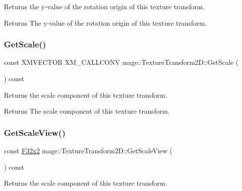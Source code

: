 Returns the y-\/value of the rotation origin of this texture transform.

\begin{DoxyReturn}{Returns}
The y-\/value of the rotation origin of this texture transform. 
\end{DoxyReturn}
\mbox{\label{classmage_1_1_texture_transform2_d_a012b9ef8da2821618b3eeb91e9888940}} 
\subsubsection{\texorpdfstring{Get\+Scale()}{GetScale()}}
{\footnotesize\ttfamily const X\+M\+V\+E\+C\+T\+OR X\+M\+\_\+\+C\+A\+L\+L\+C\+O\+NV mage\+::\+Texture\+Transform2\+D\+::\+Get\+Scale (\begin{DoxyParamCaption}{ }\end{DoxyParamCaption}) const\hspace{0.3cm}{\ttfamily [noexcept]}}

Returns the scale component of this texture transform.

\begin{DoxyReturn}{Returns}
The scale component of this texture transform. 
\end{DoxyReturn}
\mbox{\label{classmage_1_1_texture_transform2_d_a127faf8911063c5afc92daf39e97a332}} 
\subsubsection{\texorpdfstring{Get\+Scale\+View()}{GetScaleView()}}
{\footnotesize\ttfamily const \mbox{\hyperlink{namespacemage_aee4759dedc8def6c6dec26b5c7eddf29}{F32x2}} mage\+::\+Texture\+Transform2\+D\+::\+Get\+Scale\+View (\begin{DoxyParamCaption}{ }\end{DoxyParamCaption}) const\hspace{0.3cm}{\ttfamily [noexcept]}}

Returns the scale component of this texture transform.

